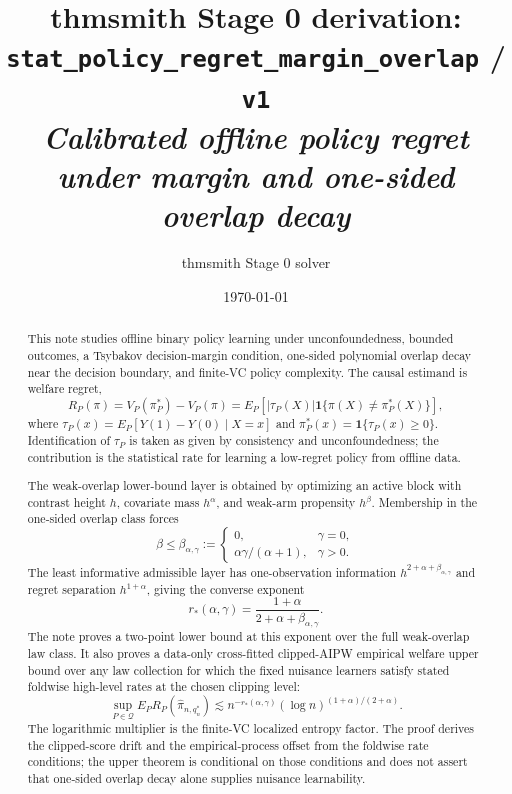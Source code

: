 \documentclass[11pt]{article}
\title{thmsmith Stage 0 derivation: \texttt{stat\_policy\_regret\_margin\_overlap} / \texttt{v1}%
  \\ \large\textit{Calibrated offline policy regret under margin and one-sided overlap decay}}
\author{thmsmith Stage 0 solver}
\date{\today}
\newcommand{\one}{\mathbf{1}}
\theoremstyle{definition}
\theoremstyle{plain}
\theoremstyle{remark}
\begin{document}
\maketitle


\begin{abstract}
This note studies offline binary policy learning under unconfoundedness,
bounded outcomes, a Tsybakov decision-margin condition, one-sided polynomial
overlap decay near the decision boundary, and finite-VC policy complexity.
The causal estimand is welfare regret,
\[
R_P(\pi)=V_P(\pi_P^*)-V_P(\pi)
      =E_P[|\tau_P(X)|\one\{\pi(X)\ne\pi_P^*(X)\}],
\]
where \(\tau_P(x)=E_P[Y(1)-Y(0)\mid X=x]\) and
\(\pi_P^*(x)=\one\{\tau_P(x)\ge0\}\).  Identification of \(\tau_P\) is taken
as given by consistency and unconfoundedness; the contribution is the
statistical rate for learning a low-regret policy from offline data.

The weak-overlap lower-bound layer is obtained by optimizing an active block
with contrast height \(h\), covariate mass \(h^\alpha\), and weak-arm
propensity \(h^\beta\).  Membership in the one-sided overlap class forces
\[
\beta\le \beta_{\alpha,\gamma}:=
\begin{cases}
0, & \gamma=0,\\
\alpha\gamma/(\alpha+1), & \gamma>0.
\end{cases}
\]
The least informative admissible layer has one-observation information
\(h^{2+\alpha+\beta_{\alpha,\gamma}}\) and regret separation
\(h^{1+\alpha}\), giving the converse exponent
\[
r_*(\alpha,\gamma)=
\frac{1+\alpha}{2+\alpha+\beta_{\alpha,\gamma}}.
\]
The note proves a two-point lower bound at this exponent over the full
weak-overlap law class.  It also proves a data-only cross-fitted
clipped-AIPW empirical welfare upper bound over any law collection for which
the fixed nuisance learners satisfy stated foldwise high-level rates at the
chosen clipping level:
\[
\sup_{P\in\mathcal Q}
E_P R_P(\widehat\pi_{n,q_n^*})
\lesssim
n^{-r_*(\alpha,\gamma)}(\log n)^{(1+\alpha)/(2+\alpha)}.
\]
The logarithmic multiplier is the finite-VC localized entropy factor.  The
proof derives the clipped-score drift and the empirical-process offset from
the foldwise rate conditions; the upper theorem is conditional on those
conditions and does not assert that one-sided overlap decay alone supplies
nuisance learnability.
\end{abstract}
\end{document}
